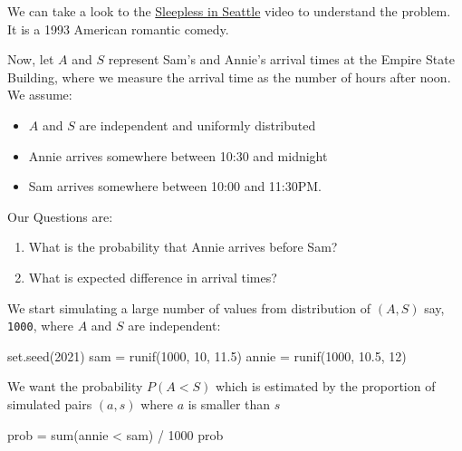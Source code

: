 \documentclass[
]{book}
\newenvironment{Shaded}{\begin{snugshade}}{\end{snugshade}}
\newcommand{\DecValTok}[1]{\textcolor[rgb]{0.00,0.00,0.81}{#1}}
\newcommand{\FloatTok}[1]{\textcolor[rgb]{0.00,0.00,0.81}{#1}}
\newcommand{\FunctionTok}[1]{\textcolor[rgb]{0.00,0.00,0.00}{#1}}
\newcommand{\NormalTok}[1]{#1}
\newcommand{\OtherTok}[1]{\textcolor[rgb]{0.56,0.35,0.01}{#1}}
\newcommand{\SpecialCharTok}[1]{\textcolor[rgb]{0.00,0.00,0.00}{#1}}
\providecommand{\tightlist}{%
  \setlength{\itemsep}{0pt}\setlength{\parskip}{0pt}}
\begin{document}
We can take a look to the \href{https://www.youtube.com/watch?v=L4Ll-xXjjXc}{Sleepless in Seattle} video to understand the problem. It is a 1993 American romantic comedy.

Now, let \(A\) and \(S\) represent Sam's and Annie's arrival times at the Empire State Building, where we measure the arrival time as the number of hours after noon. We assume:

\begin{itemize}
\tightlist
\item
  \(A\) and \(S\) are independent and uniformly distributed
\item
  Annie arrives somewhere between 10:30 and midnight
\item
  Sam arrives somewhere between 10:00 and 11:30PM.
\end{itemize}

Our Questions are:

\begin{enumerate}
\def\labelenumi{\arabic{enumi})}
\tightlist
\item
  What is the probability that Annie arrives before Sam?
\item
  What is expected difference in arrival times?
\end{enumerate}

We start simulating a large number of values from distribution of \((A,S)\) say, \texttt{1000}, where \(A\) and \(S\) are independent:

\begin{Shaded}
\begin{Highlighting}[]
\FunctionTok{set.seed}\NormalTok{(}\DecValTok{2021}\NormalTok{)}
\NormalTok{sam }\OtherTok{=} \FunctionTok{runif}\NormalTok{(}\DecValTok{1000}\NormalTok{, }\DecValTok{10}\NormalTok{, }\FloatTok{11.5}\NormalTok{)}
\NormalTok{annie }\OtherTok{=} \FunctionTok{runif}\NormalTok{(}\DecValTok{1000}\NormalTok{, }\FloatTok{10.5}\NormalTok{, }\DecValTok{12}\NormalTok{)}
\end{Highlighting}
\end{Shaded}

We want the probability \(P(A < S)\) which is estimated by the proportion of simulated pairs \((a,s)\) where \(a\) is smaller than \(s\)

\begin{Shaded}
\begin{Highlighting}[]
\NormalTok{prob }\OtherTok{=} \FunctionTok{sum}\NormalTok{(annie }\SpecialCharTok{\textless{}}\NormalTok{ sam) }\SpecialCharTok{/} \DecValTok{1000}
\NormalTok{prob}
\end{Highlighting}
\end{Shaded}
\end{document}
